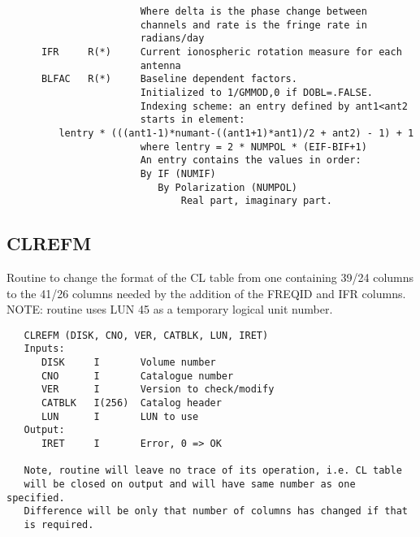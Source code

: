 \begin{verbatim}
                       Where delta is the phase change between
                       channels and rate is the fringe rate in
                       radians/day
      IFR     R(*)     Current ionospheric rotation measure for each
                       antenna
      BLFAC   R(*)     Baseline dependent factors.
                       Initialized to 1/GMMOD,0 if DOBL=.FALSE.
                       Indexing scheme: an entry defined by ant1<ant2
                       starts in element:
         lentry * (((ant1-1)*numant-((ant1+1)*ant1)/2 + ant2) - 1) + 1
                       where lentry = 2 * NUMPOL * (EIF-BIF+1)
                       An entry contains the values in order:
                       By IF (NUMIF)
                          By Polarization (NUMPOL)
                              Real part, imaginary part.
\end{verbatim}

\subsection{CLREFM}
Routine to change the format of the CL table from one containing
39/24 columns to the 41/26 columns needed by the addition of the
FREQID and IFR columns.
NOTE: routine uses LUN 45 as a temporary logical unit number.
\begin{verbatim}
   CLREFM (DISK, CNO, VER, CATBLK, LUN, IRET)
   Inputs:
      DISK     I       Volume number
      CNO      I       Catalogue number
      VER      I       Version to check/modify
      CATBLK   I(256)  Catalog header
      LUN      I       LUN to use
   Output:
      IRET     I       Error, 0 => OK

   Note, routine will leave no trace of its operation, i.e. CL table
   will be closed on output and will have same number as one specified.
   Difference will be only that number of columns has changed if that
   is required.
\end{verbatim}

